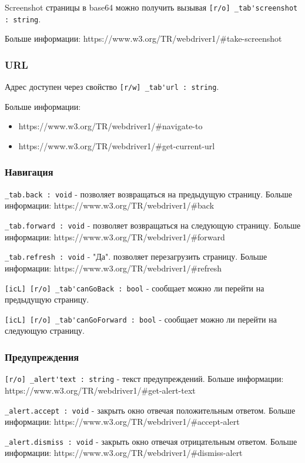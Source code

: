 \documentclass[a4paper, 14pt]{extarticle}
\newenvironment{icItems}
	{ \begin{itemize} [noitemsep,nolistsep] }
	{ \end{itemize} }
\begin{document}
Screenshot страницы в base64 можно получить вызывая \lstinline|[r/o] _tab'screenshot : string|.

Больше информации: https://www.w3.org/TR/webdriver1/\#take-screenshot

\subsubsection{URL}

Адрес доступен через свойство \lstinline|[r/w] _tab'url : string|.

Больше информации:
\begin{icItems}
\item https://www.w3.org/TR/webdriver1/\#navigate-to
\item https://www.w3.org/TR/webdriver1/\#get-current-url
\end{icItems}

\subsubsection{Навигация}

\lstinline|_tab.back : void| - позволяет возвращаться на предыдущую страницу. Больше информации: https://www.w3.org/TR/webdriver1/\#back

\lstinline|_tab.forward : void| - позволяет возвращаться на следующую страницу. Больше информации: https://www.w3.org/TR/webdriver1/\#forward

\lstinline|_tab.refresh : void| -  "Да". позволяет перезагрузить страницу. Больше информации: https://www.w3.org/TR/webdriver1/\#refresh

\lstinline|[icL] [r/o] _tab'canGoBack : bool| - сообщает можно ли перейти на предыдущую страницу.

\lstinline|[icL] [r/o] _tab'canGoForward : bool| - сообщает можно ли перейти на следующую страницу.


\subsubsection{Предупреждения}

\lstinline|[r/o] _alert'text : string| - текст предупреждений. Больше информации: https://www.w3.org/TR/webdriver1/\#get-alert-text

\lstinline|_alert.accept : void| - закрыть окно отвечая положительным ответом. Больше информации: https://www.w3.org/TR/webdriver1/\#accept-alert

\lstinline|_alert.dismiss : void| - закрыть окно отвечая отрицательным ответом. Больше информации: https://www.w3.org/TR/webdriver1/\#dismiss-alert
\end{document}
